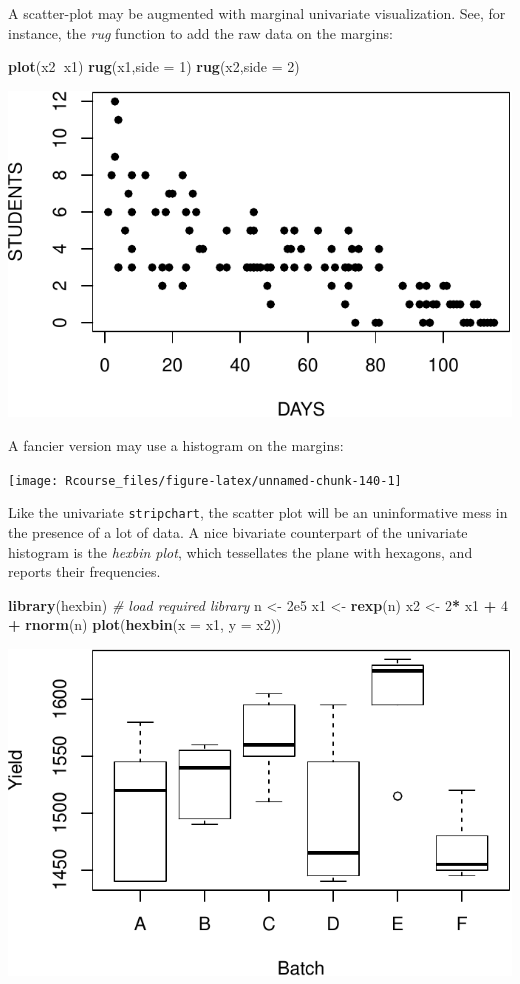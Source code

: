 \documentclass[]{book}
\newenvironment{Shaded}{\begin{snugshade}}{\end{snugshade}}
\newcommand{\KeywordTok}[1]{\textcolor[rgb]{0.13,0.29,0.53}{\textbf{#1}}}
\newcommand{\DataTypeTok}[1]{\textcolor[rgb]{0.13,0.29,0.53}{#1}}
\newcommand{\DecValTok}[1]{\textcolor[rgb]{0.00,0.00,0.81}{#1}}
\newcommand{\FloatTok}[1]{\textcolor[rgb]{0.00,0.00,0.81}{#1}}
\newcommand{\StringTok}[1]{\textcolor[rgb]{0.31,0.60,0.02}{#1}}
\newcommand{\CommentTok}[1]{\textcolor[rgb]{0.56,0.35,0.01}{\textit{#1}}}
\newcommand{\OperatorTok}[1]{\textcolor[rgb]{0.81,0.36,0.00}{\textbf{#1}}}
\newcommand{\NormalTok}[1]{#1}
\theoremstyle{definition}
\theoremstyle{definition}
\theoremstyle{definition}
\theoremstyle{remark}
\begin{document}
A scatter-plot may be augmented with marginal univariate visualization.
See, for instance, the \emph{rug} function to add the raw data on the
margins:

\begin{Shaded}
\begin{Highlighting}[]
\KeywordTok{plot}\NormalTok{(x2}\OperatorTok{~}\NormalTok{x1)}
\KeywordTok{rug}\NormalTok{(x1,}\DataTypeTok{side =} \DecValTok{1}\NormalTok{)}
\KeywordTok{rug}\NormalTok{(x2,}\DataTypeTok{side =} \DecValTok{2}\NormalTok{)}
\end{Highlighting}
\end{Shaded}

\includegraphics[width=0.5\linewidth]{Rcourse_files/figure-latex/unnamed-chunk-139-1}

A fancier version may use a histogram on the margins:

\texttt{[image: Rcourse\_files/figure-latex/unnamed-chunk-140-1]}

Like the univariate \texttt{stripchart}, the scatter plot will be an
uninformative mess in the presence of a lot of data. A nice bivariate
counterpart of the univariate histogram is the \emph{hexbin plot}, which
tessellates the plane with hexagons, and reports their frequencies.

\begin{Shaded}
\begin{Highlighting}[]
\KeywordTok{library}\NormalTok{(hexbin) }\CommentTok{# load required library}
\NormalTok{n <-}\StringTok{ }\FloatTok{2e5}
\NormalTok{x1 <-}\StringTok{ }\KeywordTok{rexp}\NormalTok{(n)}
\NormalTok{x2 <-}\StringTok{ }\DecValTok{2}\OperatorTok{*}\StringTok{ }\NormalTok{x1 }\OperatorTok{+}\StringTok{ }\DecValTok{4} \OperatorTok{+}\StringTok{ }\KeywordTok{rnorm}\NormalTok{(n)}
\KeywordTok{plot}\NormalTok{(}\KeywordTok{hexbin}\NormalTok{(}\DataTypeTok{x =}\NormalTok{ x1, }\DataTypeTok{y =}\NormalTok{ x2))}
\end{Highlighting}
\end{Shaded}

\includegraphics[width=0.5\linewidth]{Rcourse_files/figure-latex/unnamed-chunk-141-1}
\end{document}

